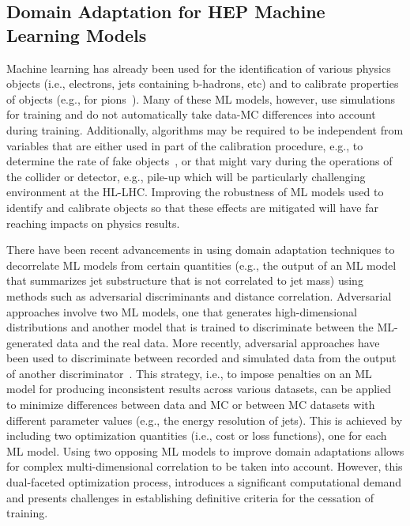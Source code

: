 \documentclass[letter, USenglish, 11pt, subfigure]{article}
\begin{document}
\subsection{Domain Adaptation for HEP Machine Learning Models}

Machine learning has already been used for the identification of various physics objects (i.e., electrons, jets containing b-hadrons, etc) and to calibrate properties of objects (e.g., for pions~\cite{ATL-PHYS-PUB-2020-018}). Many of these ML models, however, use simulations for training and do not automatically take data-MC differences into account during training. Additionally, algorithms may be required to be independent from variables that are either used in part of the calibration procedure, e.g., to determine the rate of fake objects~\cite{atlas_photon_id}, or that might vary during the operations of the collider or detector, e.g., pile-up which will be particularly challenging environment at the HL-LHC. Improving the robustness of ML models used to identify and calibrate objects so that these effects are mitigated will have far reaching impacts on physics results.

There have been recent advancements in using domain adaptation techniques to decorrelate ML models from certain quantities (e.g., the output of an ML model that summarizes jet substructure that is not correlated to jet mass) using methods such as adversarial discriminants and distance correlation. Adversarial approaches involve two ML models, one that generates high-dimensional distributions and another model that is trained to discriminate between the ML-generated data and the real data. More recently, adversarial approaches have been used to discriminate between recorded and simulated data from the output of another discriminator~\cite{calRatio}. This strategy, i.e., to impose penalties on an ML model for producing inconsistent results across various datasets, can be applied to minimize differences between data and MC or between MC datasets with different parameter values (e.g., the energy resolution of jets). This is achieved by including two optimization quantities (i.e., cost or loss functions), one for each ML model. Using two opposing ML models to improve domain adaptations allows for complex multi-dimensional correlation to be taken into account. However, this dual-faceted optimization process, introduces a significant computational demand and presents challenges in establishing definitive criteria for the cessation of training.
\end{document}
